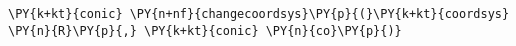 \begin{Verbatim}[commandchars=\\\{\}]
    \PY{k+kt}{conic} \PY{n+nf}{changecoordsys}\PY{p}{(}\PY{k+kt}{coordsys} \PY{n}{R}\PY{p}{,} \PY{k+kt}{conic} \PY{n}{co}\PY{p}{)}
\end{Verbatim}
